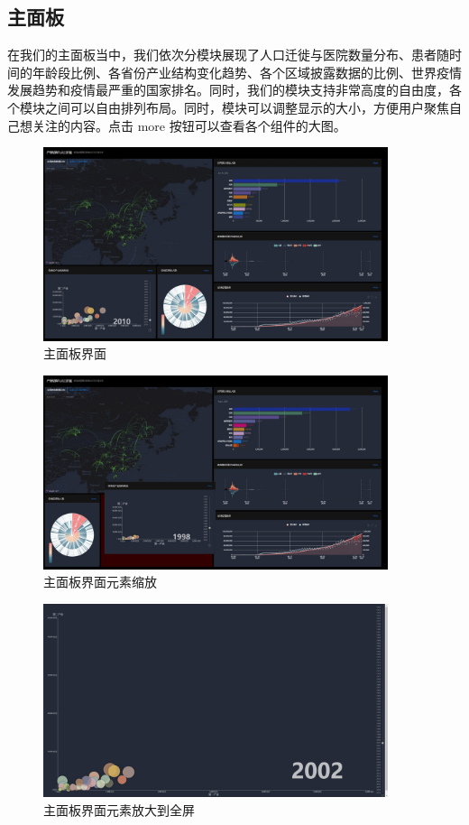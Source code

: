 \documentclass{ctexart}
\begin{document}
\subsection{主面板}
在我们的主面板当中，我们依次分模块展现了人口迁徙与医院数量分布、患者随时间的年龄段比例、各省份产业结构变化趋势、各个区域披露数据的比例、世界疫情发展趋势和疫情最严重的国家排名。同时，我们的模块支持非常高度的自由度，各个模块之间可以自由排列布局。同时，模块可以调整显示的大小，方便用户聚焦自己想关注的内容。点击 more 按钮可以查看各个组件的大图。
\begin{figure}[H]
    \centering
    \includegraphics[width=0.9\textwidth]{img/panel}
    \caption{主面板界面}
    \label{}
\end{figure}
\begin{figure}[H]
    \centering
    \includegraphics[width=0.9\textwidth]{img/paneldrag}
    \caption{主面板界面元素缩放}
    \label{}
\end{figure}
\newpage
\begin{figure}[H]
    \centering
    \includegraphics[width=0.9\textwidth]{img/panelmore}
    \caption{主面板界面元素放大到全屏}
    \label{}
\end{figure}
\newpage
\end{document}
